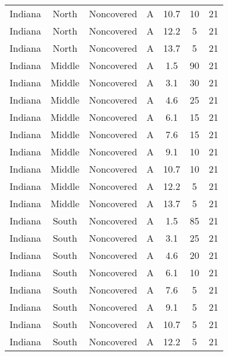 \documentclass{article}
\begin{document}
\begin{longtable}[c]{ccccccc}
Indiana   & North     & Noncovered & A               & 10.7         & 10          & 21  \\
Indiana   & North     & Noncovered & A               & 12.2         & 5           & 21  \\
Indiana   & North     & Noncovered & A               & 13.7         & 5           & 21  \\
Indiana   & Middle    & Noncovered & A               & 1.5          & 90          & 21  \\
Indiana   & Middle    & Noncovered & A               & 3.1          & 30          & 21  \\
Indiana   & Middle    & Noncovered & A               & 4.6          & 25          & 21  \\
Indiana   & Middle    & Noncovered & A               & 6.1          & 15          & 21  \\
Indiana   & Middle    & Noncovered & A               & 7.6          & 15          & 21  \\
Indiana   & Middle    & Noncovered & A               & 9.1          & 10          & 21  \\
Indiana   & Middle    & Noncovered & A               & 10.7         & 10          & 21  \\
Indiana   & Middle    & Noncovered & A               & 12.2         & 5           & 21  \\
Indiana   & Middle    & Noncovered & A               & 13.7         & 5           & 21  \\
Indiana   & South     & Noncovered & A               & 1.5          & 85          & 21  \\
Indiana   & South     & Noncovered & A               & 3.1          & 25          & 21  \\
Indiana   & South     & Noncovered & A               & 4.6          & 20          & 21  \\
Indiana   & South     & Noncovered & A               & 6.1          & 10          & 21  \\
Indiana   & South     & Noncovered & A               & 7.6          & 5           & 21  \\
Indiana   & South     & Noncovered & A               & 9.1          & 5           & 21  \\
Indiana   & South     & Noncovered & A               & 10.7         & 5           & 21  \\
Indiana   & South     & Noncovered & A               & 12.2         & 5           & 21  \\

\end{longtable}
\end{document}
